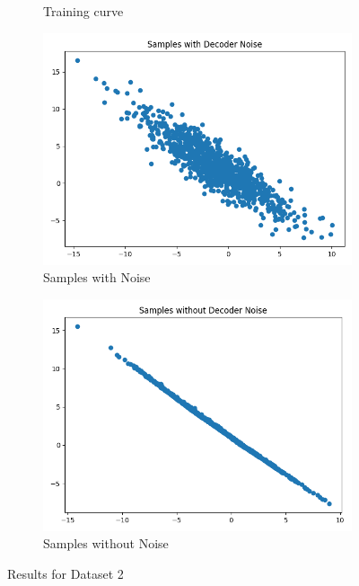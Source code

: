 \documentclass{article}
\begin{document}
\begin{enumerate}[(a)]
\begin{figure}[H]
\begin{subfigure}{0.32\textwidth}
        \caption{Training curve}
    \end{subfigure}
    \begin{subfigure}{0.32\textwidth}
        \centering
        \includegraphics[width=\textwidth]{figures/q1_a_dset2_sample_with_noise.png}
        \caption{Samples with Noise}
    \end{subfigure}
    \begin{subfigure}{0.32\textwidth}
        \centering
        \includegraphics[width=\textwidth]{figures/q1_a_dset2_sample_without_noise.png}
        \caption{Samples without Noise}
    \end{subfigure}
    \caption{Results for Dataset 2}
\end{figure}


\end{enumerate}
\end{document}
